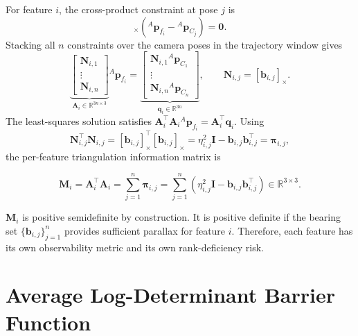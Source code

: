 \documentclass[11pt,a4paper]{article}
\newcommand{\R}{\mathbb{R}}
\newcommand{\sx}[1]{[#1]_{\times}}
\begin{document}
For feature $i$, the cross-product constraint at pose $j$ is
\begin{equation}
  \sx{\bm{b}_{i,j}}
  \left({}^{A}\bm{p}_{f_i}-{}^{A}\bm{p}_{C_j}\right)=\bm{0}.
\end{equation}
Stacking all $n$ constraints over the camera poses in the trajectory window
gives
\begin{equation}
  \underbrace{
  \begin{bmatrix}
  \bm{N}_{i,1}\\
  \vdots\\
  \bm{N}_{i,n}
  \end{bmatrix}}_{\bm{A}_i\in\R^{3n\times3}}
  {}^{A}\bm{p}_{f_i}
  =
  \underbrace{
  \begin{bmatrix}
  \bm{N}_{i,1}{}^{A}\bm{p}_{C_1}\\
  \vdots\\
  \bm{N}_{i,n}{}^{A}\bm{p}_{C_n}
  \end{bmatrix}}_{\bm{q}_i\in\R^{3n}},
  \qquad
  \bm{N}_{i,j}=\sx{\bm{b}_{i,j}}.
\end{equation}
The least-squares solution satisfies
$\bm{A}_{i}^{\top}\bm{A}_{i}{}^{A}\bm{p}_{f_i}
=\bm{A}_{i}^{\top}\bm{q}_{i}$.  Using
\begin{equation}
  \bm{N}_{i,j}^{\top}\bm{N}_{i,j}
  = \sx{\bm{b}_{i,j}}^{\top}\sx{\bm{b}_{i,j}}
  = \eta_{i,j}^{2}\bm{I}
    -\bm{b}_{i,j}\bm{b}_{i,j}^{\top}
  = \bm{\pi}_{i,j},
\end{equation}
the per-feature triangulation information matrix is
\begin{resultbox}
\begin{equation}
  \boxed{
  \bm{M}_{i}
  = \bm{A}_{i}^{\top}\bm{A}_{i}
  = \sum_{j=1}^{n}\bm{\pi}_{i,j}
  = \sum_{j=1}^{n}\left(\eta_{i,j}^{2}\bm{I}
  -\bm{b}_{i,j}\bm{b}_{i,j}^{\top}\right)
  \in\R^{3\times3}.}
  \label{eq:Mi_def}
\end{equation}
\end{resultbox}

\begin{remark}
$\bm{M}_{i}$ is positive semidefinite by construction.  It is positive
definite if the bearing set $\{\bm{b}_{i,j}\}_{j=1}^{n}$ provides sufficient
parallax for feature $i$.  Therefore, each feature has its own observability
metric and its own rank-deficiency risk.
\end{remark}

\section{Average Log-Determinant Barrier Function}
\end{document}
